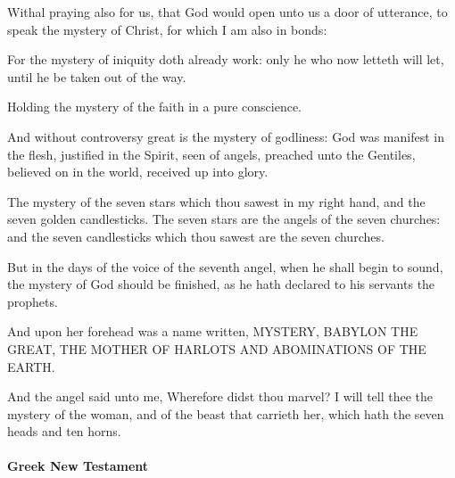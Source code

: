 \begin{compactdesc}
				\item[{\hyperref[COLOSSIANS-4-3]{Colossians 4:3}}] Withal praying also for us, that God would open unto us a door of utterance, to speak the mystery of Christ, for which I am also in bonds:
				\item[{\hyperref[2THESSALONIANS-2-7]{2 Thessalonians 2:7}}] For the mystery of iniquity doth already work: only he who now letteth will let, until he be taken out of the way.
				\item[{\hyperref[1TIMOTHY-3-9]{1 Timothy 3:9}}] Holding the mystery of the faith in a pure conscience.
				\item[{\hyperref[1TIMOTHY-3-16]{1 Timothy 3:16}}] And without controversy great is the mystery of godliness: God was manifest in the flesh, justified in the Spirit, seen of angels, preached unto the Gentiles, believed on in the world, received up into glory.
				\item[{\hyperref[REVELATION-1-20]{Revelation 1:20}}] The mystery of the seven stars which thou sawest in my right hand, and the seven golden candlesticks.  The seven stars are the angels of the seven churches: and the seven candlesticks which thou sawest are the seven churches.
				\item[{\hyperref[REVELATION-10-7]{Revelation 10:7}}] But in the days of the voice of the seventh angel, when he shall begin to sound, the mystery of God should be finished, as he hath declared to his servants the prophets.
				\item[{\hyperref[REVELATION-17-5]{Revelation 17:5}}] And upon her forehead was a name written, MYSTERY, BABYLON THE GREAT, THE MOTHER OF HARLOTS AND ABOMINATIONS OF THE EARTH.
				\item[{\hyperref[REVELATION-17-7]{Revelation 17:7}}] And the angel said unto me, Wherefore didst thou marvel?  I will tell thee the mystery of the woman, and of the beast that carrieth her, which hath the seven heads and ten horns.
			\end{compactdesc}
			
		\paragraph{Greek New Testament} %
			\label{MYSTERY-GREEK}
		
			\subparagraph{\texorpdfstring{}{}}
				\label{MUSTERION}
			
